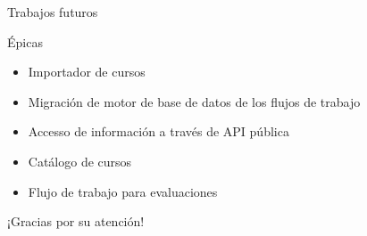 \documentclass[10pt,xcolor=table ]{beamer}
\begin{document}
\begin{frame}{Trabajos futuros}
	\begin{block}{Épicas}
		\begin{itemize}
			\item Importador de cursos
		    \item Migración de motor de base de datos de los flujos de trabajo
		    \item Accesso de información a través de API pública
		    \item Catálogo de cursos
		    \item Flujo de trabajo para evaluaciones
    	\end{itemize}
	\end{block}
\end{frame}

\begin{frame}[standout]
  ¡Gracias por su atención!
\end{frame}
\end{document}
